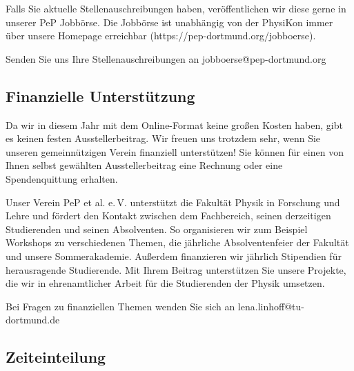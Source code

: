 \documentclass[
  paper=a4,
  fontsize=12pt,
  DIV=16,
  headheight=30pt,
  footheight=45pt,
  headinclude,
  parskip=half,
]{scrartcl}
\begin{document}
Falls Sie aktuelle Stellenauschreibungen haben, veröffentlichen wir diese gerne in unserer PeP Jobbörse.
Die Jobbörse ist unabhängig von der PhysiKon immer über unsere Homepage erreichbar (https://pep-dortmund.org/jobboerse).

Senden Sie uns Ihre Stellenauschreibungen an jobboerse@pep-dortmund.org

\subsection*{Finanzielle Unterstützung}

Da wir in diesem Jahr mit dem Online-Format keine großen Kosten haben, gibt es keinen festen Ausstellerbeitrag.
Wir freuen uns trotzdem sehr, wenn Sie unseren gemeinnützigen Verein finanziell unterstützen!
Sie können für einen von Ihnen selbst gewählten Ausstellerbeitrag eine Rechnung oder eine Spendenquittung erhalten.

Unser Verein PeP et al. e.\,V. unterstützt die Fakultät Physik in Forschung und Lehre und fördert den Kontakt zwischen dem Fachbereich, seinen derzeitigen Studierenden und seinen Absolventen.
So organisieren wir zum Beispiel Workshops zu verschiedenen Themen, die jährliche Absolventenfeier der Fakultät und unsere Sommerakademie.
Außerdem finanzieren wir jährlich Stipendien für herausragende Studierende.
Mit Ihrem Beitrag unterstützen Sie unsere Projekte, die wir in ehrenamtlicher Arbeit für die Studierenden der Physik umsetzen.

Bei Fragen zu finanziellen Themen wenden Sie sich an lena.linhoff@tu-dortmund.de

\subsection*{Zeiteinteilung}
\end{document}
